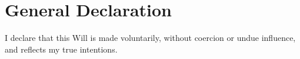 
\section{General Declaration}
\label{sec:declaration}

I declare that this Will is made voluntarily, without coercion or undue influence, and reflects my true intentions.

